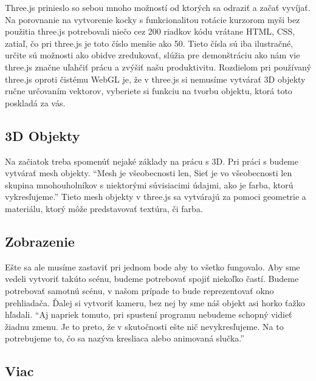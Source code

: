 \documentclass[10pt,oneside,slovak,a4paper]{article}
\begin{document}
Three.js prinieslo so sebou mnoho možností od ktorých sa odraziť a začať vyvíjať.
Na porovnanie na vytvorenie kocky s funkcionalitou rotácie kurzorom myši bez použitia three.js potrebovali niečo cez 200 riadkov kódu vrátane HTML, CSS, zatiaľ, čo pri three.js je toto číslo menšie ako 50.
Tieto čísla sú iba ilustračné, určite sú možnosti ako obidve zredukovať, slúžia pre demonštráciu ako nám vie three.js značne uľahčiť prácu a zvýšiť našu produktivitu.
Rozdielom pri používaný three.js oproti čistému WebGL je, že v three.js si nemusíme vytvárať 3D objekty ručne určovaním vektorov, vyberiete si funkciu na tvorbu objektu, ktorá toto poskladá za vás.

\subsection{3D Objekty}

Na začiatok treba spomenúť nejaké základy na prácu s 3D. Pri práci s budeme vytvárať mesh objekty.
“Mesh je všeobecnosti len, Sieť je vo všeobecnosti len skupina mnohouholníkov s niektorými súvisiacimi údajmi, ako je farba, ktorú vykresľujeme.” \cite{Graphics-openGL}
Tieto mesh objekty v three.js sa vytvárajú za pomoci geometrie a materiálu, ktorý môže predstavovať textúra, či farba.

\subsection{Zobrazenie}

Ešte sa ale musíme zastaviť pri jednom bode aby to všetko fungovalo. Aby sme vedeli vytvoriť takúto scénu, budeme potrebovať spojiť niekoľko častí.
Budeme potrebovať samotnú scénu, v našom prípade to bude reprezentovať okno prehliadača. Ďalej si vytvoriť kameru, bez nej by sme náš objekt asi horko ťažko hľadali.
“Aj napriek tomuto, pri spustení programu nebudeme schopný vidieť žiadnu zmenu. Je to preto, že v skutočnosti ešte nič nevykresľujeme. Na to potrebujeme to, čo sa nazýva kresliaca alebo animovaná slučka.” \cite{Three-js}

\subsection{Viac}
\end{document}
